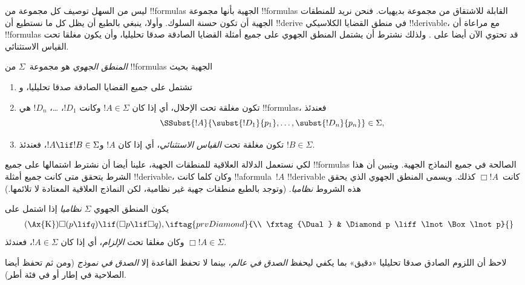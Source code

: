 \documentclass[../../../include/open-logic-section]{subfiles}
\begin{document}


ليس من السهل توصيف كل مجموعة من !!{formula}s الجهية بأنها مجموعة
!!{formula}s القابلة للاشتقاق من مجموعة بديهيات. فنحن نريد للمنطقات
الجهية أن تكون حسنة السلوك. وأولا، ينبغي بالطبع أن يظل كل ما نستطيع
أن !!{derive} في منطق القضايا الكلاسيكي !!{derivable}، مع مراعاة أن
!!{formula}s قد تحتوي الآن أيضا على
. ولذلك نشترط أن يشتمل
المنطق الجهوي على جميع أمثلة القضايا الصادقة صدقا تحليليا، وأن يكون
مغلقا تحت القياس الاستثنائي.

\begin{defn}
  \emph{المنطق الجهوي} هو مجموعة~$\Sigma$ من !!{formula}s الجهية بحيث
  \begin{enumerate}
  \item تشتمل على جميع القضايا الصادقة صدقا تحليليا، و
  \item تكون مغلقة تحت الإحلال، أي إذا كان $!A \in \Sigma$ وكانت
    $!D_1$، \dots، $!D_n$ هي !!{formula}s، فعندئذ
    \[
    \SSubst{!A}{\subst{!D_1}{p_1}, \dots, \subst{!D_n}{p_n}} \in \Sigma,
    \]
  \item تكون مغلقة تحت \emph{القياس الاستثنائي}، أي إذا كان $!A$
    و$!A \lif !B \in \Sigma$، فعندئذ $!B \in \Sigma$.
  \end{enumerate}
\end{defn}

لكي نستعمل الدلالة العلاقية للمنطقات الجهية، علينا أيضا أن نشترط
اشتمالها على جميع !!{formula}s الصالحة في جميع النماذج الجهية. ويتبين
أن هذا الشرط يتحقق متى كانت جميع أمثلة 
 !!{derivable}، وكان كلما كانت
!!a{formula}~$!A$ !!{derivable} كانت~$\Box !A$ كذلك. ويسمى المنطق
الجهوي الذي يحقق هذه الشروط \emph{نظاميا}. (وتوجد بالطبع منطقات
جهية غير نظامية، لكن النماذج العلاقية المعتادة لا تلائمها.)

\begin{defn}
  يكون المنطق الجهوي $\Sigma$ \emph{نظاميا} إذا اشتمل على
  \begin{align*}
    \tag{\Ax{K}} & \Box(p \lif q) \lif (\Box p \lif \Box q),
    \iftag{prvDiamond}{\\
      \tag{\Dual} & \Diamond p \liff \lnot\Box\lnot p}{}
  \end{align*}
  وكان مغلقا تحت \emph{الإلزام}، أي إذا كان $!A \in
  \Sigma$، فعندئذ $\Box !A \in \Sigma$.
\end{defn}

لاحظ أن اللزوم الصادق صدقا تحليليا «دقيق» بما يكفي ليحفظ
\emph{الصدق في عالم}، بينما لا تحفظ القاعدة \Nec{} إلا \emph{الصدق
في نموذج} (ومن ثم تحفظ أيضا الصلاحية في إطار أو في فئة أطر).
\end{document}
